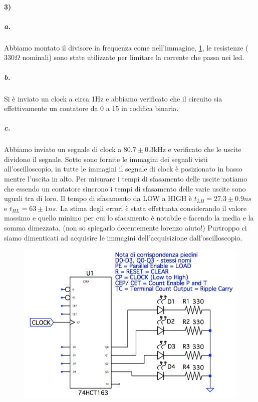 \documentclass{article}
\begin{document}
\paragraph{3)}
	\subparagraph{a.} Abbiamo montato il divisore in frequenza come nell'immagine, \ref{fig:div_freq1}, le resistenze ($330\Omega$ nominali) sono state utilizzate per limitare la corrente che passa nei led.
	\subparagraph{b.} Si è inviato un clock a circa 1Hz e abbiamo verificato che il circuito sia effettivamente un contatore da 0 a 15 in codifica binaria.
	\subparagraph{c.} Abbiamo inviato un segnale di clock a $80.7\pm0.3$kHz e verificato che le uscite dividono il segnale. Sotto sono fornite le immagini dei segnali visti all'oscilloscopio, in tutte le immagini il segnale di clock è posizionato in basso mentre l'uscita in alto.\newline
	Per misurare i tempi di sfasamento delle uscite notiamo che essendo un contatore sincrono i tempi di sfasamento delle varie uscite sono uguali tra di loro. Il tempo di sfasamento da LOW a HIGH è $t_{LH}=27.3\pm0.9ns$ e $t_{HL}=63\pm1ns$. La stima degli errori è stata effettuata considerando il valore massimo e quello minimo per cui lo sfasamento è notabile e facendo la media e la somma dimezzata. (non so spiegarlo decentemente lorenzo aiuto!)\newline
	Purtroppo ci siamo dimenticati ad acquisire le immagini dell'acquisizione dall'oscilloscopio.\newline
	
	\begin{figure}
	\begin{center}
		\includegraphics[width=0.7\linewidth]{immagini/div_freq1}
		\label{fig:div_freq1}
	\end{center}
	\end{figure}
\end{document}
